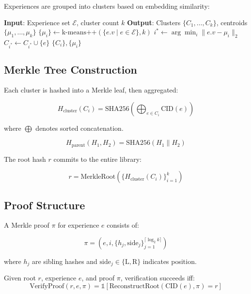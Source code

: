 Experiences are grouped into clusters based on embedding similarity:

\begin{algorithm}[t]
\caption{Semantic Cluster Construction}
\label{alg:cluster}
\begin{algorithmic}[1]
\STATE \textbf{Input}: Experience set $\mathcal{E}$, cluster count $k$
\STATE \textbf{Output}: Clusters $\{C_1, \ldots, C_k\}$, centroids $\{\mu_1, \ldots, \mu_k\}$
\STATE $\{\mu_i\} \leftarrow \text{k-means++}(\{e.v \mid e \in \mathcal{E}\}, k)$
    \STATE $i^* \leftarrow \arg\min_i \|e.v - \mu_i\|_2$
    \STATE $C_{i^*} \leftarrow C_{i^*} \cup \{e\}$
\ENDFOR
\RETURN $\{C_i\}, \{\mu_i\}$
\end{algorithmic}
\end{algorithm}

\subsection{Merkle Tree Construction}

Each cluster is hashed into a Merkle leaf, then aggregated:

\begin{equation}
H_{\text{cluster}}(C_i) = \text{SHA256}\left(\bigoplus_{e \in C_i} \text{CID}(e)\right)
\end{equation}

where $\bigoplus$ denotes sorted concatenation.

\begin{equation}
H_{\text{parent}}(H_1, H_2) = \text{SHA256}(H_1 \| H_2)
\end{equation}

The root hash $r$ commits to the entire library:

\begin{equation}
r = \text{MerkleRoot}(\{H_{\text{cluster}}(C_i)\}_{i=1}^k)
\end{equation}

\subsection{Proof Structure}

A Merkle proof $\pi$ for experience $e$ consists of:

\begin{equation}
\pi = (e, i, \{h_j, \text{side}_j\}_{j=1}^{\lceil \log_2 k \rceil})
\end{equation}

where $h_j$ are sibling hashes and $\text{side}_j \in \{\text{L}, \text{R}\}$ indicates position.

\begin{theorem}
Given root $r$, experience $e$, and proof $\pi$, verification succeeds iff:
\begin{equation}
\text{VerifyProof}(r, e, \pi) = \mathbb{1}[\text{ReconstructRoot}(\text{CID}(e), \pi) = r]
\end{equation}
\end{theorem}


